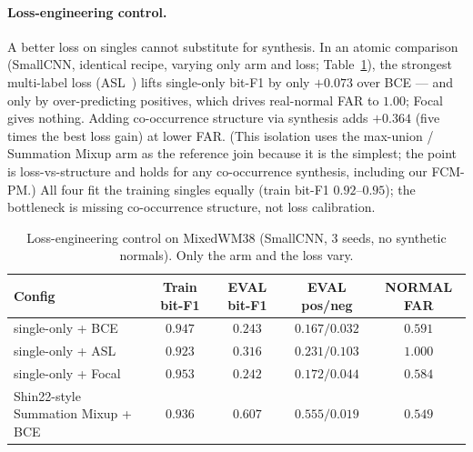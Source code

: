 \documentclass[11pt]{article}
\begin{document}
\paragraph{Loss-engineering control.} A better loss on singles cannot
substitute for synthesis. In an atomic comparison (SmallCNN, identical
recipe, varying only arm and loss; Table~\ref{tab:losscontrol}), the
strongest multi-label loss (ASL~\cite{benbaruch2021asl}) lifts single-only
bit-F1 by only $+0.073$ over BCE --- and only by over-predicting positives,
which drives real-normal FAR to $1.00$; Focal~\cite{lin2017focal} gives
nothing. Adding co-occurrence structure via synthesis adds $+0.364$ (five times
the best loss gain) at lower FAR. (This isolation uses the max-union / Summation
Mixup arm as the reference join because it is the simplest; the point is
loss-vs-structure and holds for any co-occurrence synthesis, including our FCM-PM.)
All four fit the training singles equally (train bit-F1 $0.92$--$0.95$); the
bottleneck is missing co-occurrence structure, not loss calibration.

\begin{table}[t]
\centering
\caption{Loss-engineering control on MixedWM38 (SmallCNN, 3 seeds, no
synthetic normals). Only the arm and the loss vary.}
\label{tab:losscontrol}
\begin{tabular}{lcccc}
\toprule
Config & Train bit-F1 & EVAL bit-F1 & EVAL pos/neg & NORMAL FAR \\
\midrule
single-only + BCE      & $0.947$ & $0.243$ & $0.167/0.032$ & $0.591$ \\
single-only + ASL      & $0.923$ & $0.316$ & $0.231/0.103$ & $1.000$ \\
single-only + Focal    & $0.953$ & $0.242$ & $0.172/0.044$ & $0.584$ \\
Shin22-style Summation Mixup + BCE & $0.936$ & $\mathbf{0.607}$ & $0.555/0.019$ & $0.549$ \\
\bottomrule
\end{tabular}
\end{table}
\end{document}
